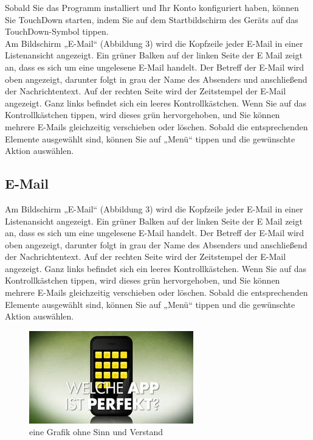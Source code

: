 Sobald Sie das Programm installiert und Ihr Konto konfiguriert haben,
können Sie TouchDown starten, indem Sie auf dem Startbildschirm des
Geräts auf das TouchDown-Symbol tippen.
\\
Am Bildschirm „E-Mail“ (Abbildung 3) wird die Kopfzeile jeder E-Mail in
einer Listenansicht angezeigt. Ein grüner Balken auf der linken Seite der E
Mail zeigt an, dass es sich um eine ungelesene E-Mail handelt. Der Betreff
der E-Mail wird oben angezeigt, darunter folgt in grau der Name des
Absenders und anschließend der Nachrichtentext. Auf der rechten Seite
wird der Zeitstempel der E-Mail angezeigt. Ganz links befindet sich ein
leeres Kontrollkästchen. Wenn Sie auf das Kontrollkästchen tippen, wird
dieses grün hervorgehoben, und Sie können mehrere E-Mails gleichzeitig
verschieben oder löschen. Sobald die entsprechenden Elemente ausgewählt
sind, können Sie auf „Menü“ tippen und die gewünschte Aktion auswählen.

\subsection{E-Mail}

Am Bildschirm „E-Mail“ (Abbildung 3) wird die Kopfzeile jeder E-Mail in
einer Listenansicht angezeigt. Ein grüner Balken auf der linken Seite der E
Mail zeigt an, dass es sich um eine ungelesene E-Mail handelt. Der Betreff
der E-Mail wird oben angezeigt, darunter folgt in grau der Name des
Absenders und anschließend der Nachrichtentext. Auf der rechten Seite
wird der Zeitstempel der E-Mail angezeigt. Ganz links befindet sich ein
leeres Kontrollkästchen. Wenn Sie auf das Kontrollkästchen tippen, wird
dieses grün hervorgehoben, und Sie können mehrere E-Mails gleichzeitig
verschieben oder löschen. Sobald die entsprechenden Elemente ausgewählt
sind, können Sie auf „Menü“ tippen und die gewünschte Aktion auswählen.

\begin{figure}[h]
	\centering
	\includegraphics[scale=1.0]{03_Bedienungsanleitung/img/perfekt.jpg}
	\caption{eine Grafik ohne Sinn und Verstand}
	\label{img:grafik-dummy}
\end{figure}
